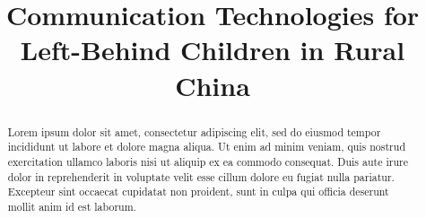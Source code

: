 \documentclass[conference]{IEEEtran}
\begin{document}

\title{Communication Technologies for \\Left-Behind Children in Rural China \vspace{0.5cm}}

\author{
\and
{}
}


\maketitle

\begin{abstract}
Lorem ipsum dolor sit amet, consectetur adipiscing elit, sed do eiusmod tempor incididunt ut labore et dolore magna aliqua. Ut enim ad minim veniam, quis nostrud exercitation ullamco laboris nisi ut aliquip ex ea commodo consequat. Duis aute irure dolor in reprehenderit in voluptate velit esse cillum dolore eu fugiat nulla pariatur. Excepteur sint occaecat cupidatat non proident, sunt in culpa qui officia deserunt mollit anim id est laborum.
\end{abstract}
\end{document}
